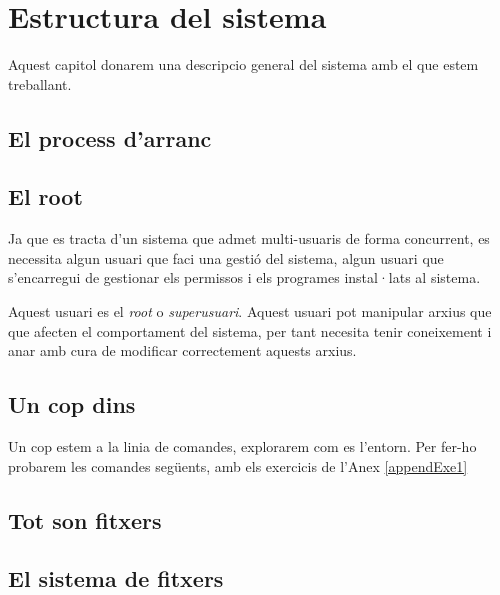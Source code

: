 \section{Estructura del sistema}

Aquest capitol donarem una descripcio general del sistema amb el que estem treballant.

\subsection{El process d'arranc}

\subsection{El root}

\par
Ja que es tracta d'un sistema que admet multi-usuaris de forma concurrent, es necessita algun usuari que faci una gestió del sistema, algun usuari que s'encarregui de gestionar els permissos i els programes instal·lats al sistema.
\par
Aquest usuari es el \textit{root} o  \textit{superusuari}. Aquest usuari pot manipular arxius que que afecten el comportament del sistema, per tant necesita tenir coneixement i anar amb cura de modificar correctement aquests arxius.

\subsection{Un cop dins}

Un cop estem a la linia de comandes, explorarem com es l'entorn. Per fer-ho probarem les comandes següents, amb els exercicis de l'Anex \ref{appendExe1}


\subsection{Tot son fitxers}

\subsection{El sistema de fitxers}


